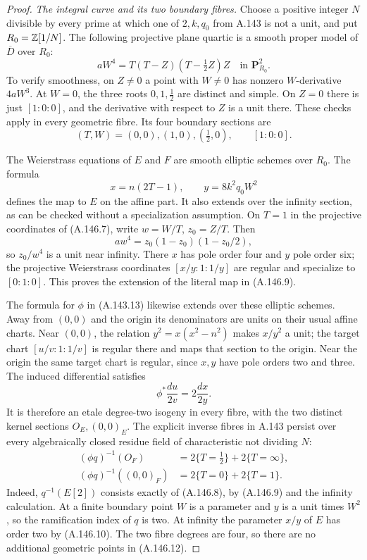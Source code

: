 \begin{proof}
\emph{The integral curve and its two boundary fibres.}
Choose a positive integer \(N\) divisible by every prime at
which one of \(2,k,q_0\) from A.143 is not a unit, and put
\(R_0=\mathbb Z[1/N]\).
The following projective plane quartic is a smooth proper model
of \(\overline D\) over \(R_0\):
\[
        aW^4=T(T-Z)(T-\tfrac12Z)Z
                     \quad\text{in }\mathbf P^2_{R_0}.
\tag{A.146.7}
\]
To verify smoothness, on \(Z\ne0\) a point with \(W\ne0\)
has nonzero \(W\)-derivative \(4aW^3\).
At \(W=0\), the three roots \(0,1,\tfrac12\) are distinct
and simple.  On \(Z=0\) there is just \([1:0:0]\), and the
derivative with respect to \(Z\) is a unit there.
These checks apply in every geometric fibre.
Its four boundary sections are
\[
 (T,W)=(0,0),(1,0),(\tfrac12,0),\qquad [1:0:0].
\tag{A.146.8}
\]

The Weierstrass equations of \(E\) and \(F\) are smooth
elliptic schemes over \(R_0\).
The formula
\[
                 x=n(2T-1),\qquad y=8k^2q_0W^2
\tag{A.146.9}
\]
defines the map to \(E\) on the affine part.
It also extends over the infinity section, as can be checked
without a specialization assumption.
On \(T=1\) in the projective coordinates of (A.146.7), write
\(w=W/T\), \(z_0=Z/T\).  Then
\[
             aw^4=z_0(1-z_0)(1-z_0/2),
\tag{A.146.10}
\]
so \(z_0/w^4\) is a unit near infinity.
There \(x\) has pole order four and \(y\) pole order six;
the projective Weierstrass coordinates \([x/y:1:1/y]\)
are regular and specialize to \([0:1:0]\).
This proves the extension of the literal map in (A.146.9).

The formula for \(\phi\) in (A.143.13) likewise extends over
these elliptic schemes.
Away from \((0,0)\) and the origin its denominators are units
on their usual affine charts.  Near \((0,0)\), the relation
\(y^2=x(x^2-n^2)\) makes \(x/y^2\) a unit;
the target chart \([u/v:1:1/v]\) is regular there and maps
that section to the origin.  Near the origin the same target
chart is regular, since \(x,y\) have pole orders two and three.
The induced differential satisfies
\[
                    \phi^*\frac{du}{2v}=2\frac{dx}{2y}.
\tag{A.146.11}
\]
It is therefore an etale degree-two isogeny in every fibre,
with the two distinct kernel sections \(O_E,(0,0)_E\).
The explicit inverse fibres in A.143 persist over every
algebraically closed residue field of characteristic not
dividing \(N\):
\[
 \begin{aligned}
 (\phi q)^{-1}(O_F)&=2\{T=\tfrac12\}+2\{T=\infty\},\\
 (\phi q)^{-1}((0,0)_F)&=2\{T=0\}+2\{T=1\}.
 \end{aligned}
\tag{A.146.12}
\]
Indeed, \(q^{-1}(E[2])\) consists exactly of (A.146.8),
by (A.146.9) and the infinity calculation.
At a finite boundary point \(W\) is a parameter and
\(y\) is a unit times \(W^2\), so the ramification index
of \(q\) is two.  At infinity the parameter \(x/y\) of
\(E\) has order two by (A.146.10).
The two fibre degrees are four, so there are no additional
geometric points in (A.146.12).


\end{proof}

